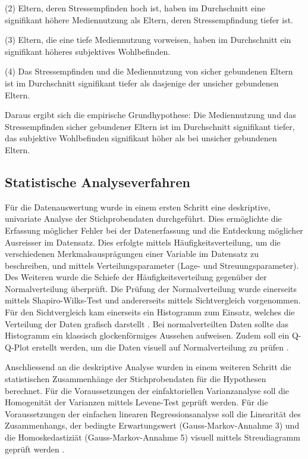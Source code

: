 (2) Eltern, deren Stressempfinden hoch ist, haben im Durchschnitt eine signifikant höhere Mediennutzung als Eltern, deren Stressempfindung tiefer ist.

(3) Eltern, die eine tiefe Mediennutzung vorweisen, haben im Durchschnitt ein signifikant höheres subjektives Wohlbefinden.

(4) Das Stressempfinden und die Mediennutzung von sicher gebundenen Eltern ist im Durchschnitt signifikant tiefer als dasjenige der unsicher gebundenen Eltern.

Daraus ergibt sich die empirische Grundhypothese: Die Mediennutzung und das Stressempfinden sicher gebundener Eltern ist im Durchschnitt signifikant tiefer, das subjektive Wohlbefinden signifikant höher als bei unsicher gebundenen Eltern.


\subsection{Statistische Analyseverfahren}
Für die Datenauswertung wurde in einem ersten Schritt eine deskriptive, univariate Analyse der Stichprobendaten durchgeführt. Dies ermöglichte die Erfassung möglicher Fehler bei der Datenerfassung und die Entdeckung möglicher Ausreisser im Datensatz. Dies erfolgte mittels Häufigkeitsverteilung, um die verschiedenen Merkmalsausprägungen einer Variable im Datensatz zu beschreiben, und mittels Verteilungsparameter (Lage- und Streuungsparameter). Des Weiteren wurde die Schiefe der Häufigkeitsverteilung gegenüber der Normalverteilung überprüft. Die Prüfung der Normalverteilung wurde einerseits mittels Shapiro-Wilks-Test \cite{Shapiro1965} und andererseits mittels Sichtvergleich vorgenommen. Für den Sichtvergleich kam einerseits ein Histogramm zum Einsatz, welches die Verteilung der Daten grafisch darstellt \cite{Hemmerich2018}. Bei normalverteilten Daten sollte das Histogramm ein klassisch glockenförmiges Aussehen aufweisen. Zudem soll ein Q-Q-Plot erstellt werden, um die Daten visuell auf Normalverteilung zu prüfen \cite{Hemmerich2018}. 

Anschliessend an die deskriptive Analyse wurden in einem weiteren Schritt die statistischen Zusammenhänge der Stichprobendaten für die Hypothesen berechnet. Für die Voraussetzungen der einfaktoriellen Varianzanalyse soll die Homogenität der Varianzen mittels Levene-Test geprüft werden. Für die Voraussetzungen der einfachen linearen Regressionsanalyse soll die Linearität des Zusammenhangs, der bedingte Erwartungswert (Gauss-Markov-Annahme 3) und die Homoskedastiziät (Gauss-Markov-Annahme 5) visuell mittels Streudiagramm geprüft werden \cite{UniversitatZurich2018}.

